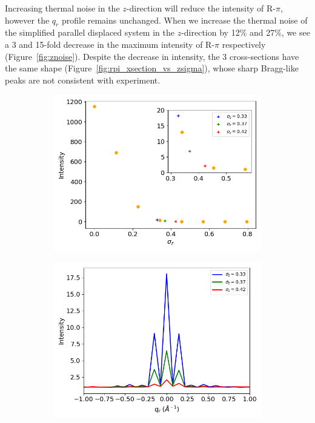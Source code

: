 \documentclass[journal=jpcbfk,manuscript=article]{achemso}
\begin{document}
  Increasing thermal noise in the $z$-direction will reduce the intensity
  of R-$\pi$, however the $q_r$ profile remains unchanged. When we increase the
  thermal noise of the simplified parallel displaced system in the $z$-direction by
  12\% and 27\%, we see a 3 and 15-fold decrease in the maximum intensity of 
  R-$\pi$ respectively (Figure~\ref{fig:znoise}). Despite the decrease in 
  intensity, the 3 cross-sections have the same shape 
  (Figure~\ref{fig:rpi_xsection_vs_zsigma}), whose sharp Bragg-like peaks are
  not consistent with experiment. 
  
  \begin{figure}[!htb]
  \centering
  \begin{subfigure}{0.45\textwidth}
  \includegraphics[width=\textwidth]{intensity_vs_zsigma.png}
  \caption{}\label{fig:intensity_vs_zsigma}
  \end{subfigure}
  \begin{subfigure}{0.45\textwidth}
  \includegraphics[width=\textwidth]{rpi_xsection_vs_zsigma.png}

\end{subfigure}
\end{figure}
\end{document}
